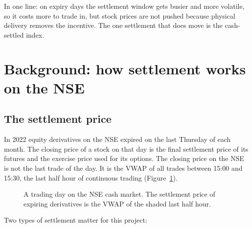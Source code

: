 \documentclass[11pt,a4paper]{article}
\begin{document}
\begin{takeaway}
In one line: on expiry days the settlement window gets busier and more volatile, so it costs
more to trade in, but stock prices are not pushed because physical delivery removes the
incentive. The one settlement that does move is the cash-settled index.
\end{takeaway}

\section{Background: how settlement works on the NSE}

\subsection{The settlement price}

In 2022 equity derivatives on the NSE expired on the last Thursday of each month. The closing
price of a stock on that day is the final settlement price of its futures and the exercise
price used for its options. The closing price on the NSE is not the last trade of the day. It is
the VWAP of all trades between 15:00 and 15:30, the last half hour of continuous trading
(Figure~\ref{fig:timeline}).

\begin{figure}[H]
\centering
{}
\caption{A trading day on the NSE cash market. The settlement price of expiring derivatives is
  the VWAP of the shaded last half hour.}
\label{fig:timeline}
\end{figure}

Two types of settlement matter for this project:
\end{document}
